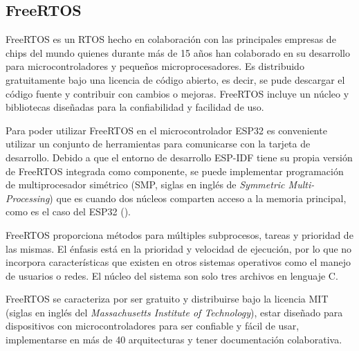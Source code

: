 \subsection{FreeRTOS}

FreeRTOS es un RTOS hecho en colaboración con las principales empresas de chips del mundo quienes durante más de 15 años han colaborado en su desarrollo para microcontroladores y pequeños microprocesadores. Es distribuido gratuitamente bajo una licencia de código abierto, es decir, se pude descargar el código fuente y contribuir con cambios o mejoras. FreeRTOS incluye un núcleo y bibliotecas diseñadas para la confiabilidad y facilidad de uso.

\vspace{0.5cm}

Para poder utilizar FreeRTOS en el microcontrolador ESP32 es conveniente utilizar un conjunto de herramientas para comunicarse con la tarjeta de desarrollo. Debido a que el entorno de desarrollo ESP-IDF tiene su propia versión de FreeRTOS integrada como componente, se puede implementar programación de multiprocesador simétrico (SMP, siglas en inglés de \textit{Symmetric Multi-Processing}) que es cuando dos núcleos comparten acceso a la memoria principal, como es el caso del ESP32 (\cite{aws_freertos_esp32}).

\vspace{0.5cm}

FreeRTOS proporciona métodos para múltiples subprocesos, tareas y prioridad de las mismas. El énfasis está en la prioridad y velocidad de ejecución, por lo que no incorpora características que existen en otros sistemas operativos como el manejo de usuarios o redes. El núcleo del sistema son solo tres archivos en lenguaje C.

\vspace{0.5cm}

FreeRTOS se caracteriza por ser gratuito y distribuirse bajo la licencia MIT (siglas en inglés del \textit{Massachusetts Institute of Technology}), estar diseñado para dispositivos con microcontroladores para ser confiable y fácil de usar, implementarse en más de 40 arquitecturas y tener documentación colaborativa.